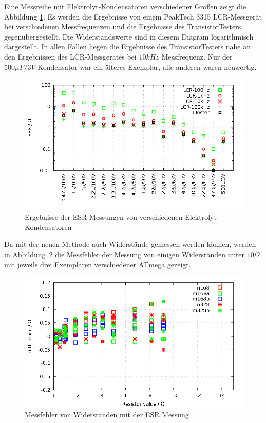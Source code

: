 Eine Messreihe mit Elektrolyt-Kondensatoren verschiedener Größen zeigt die Abbildung \ref{fig:ElcoESR}.
Es werden die Ergebnisse von einem PeakTech 3315 LCR-Messgerät bei verschiedenen Messfrequenzen und die
Ergebnisse des TransistorTesters gegenübergestellt. Die Widerstandswerte sind in diesem Diagram logarithmisch dargestellt.
In allen Fällen liegen die Ergebnisse des TransistorTesters
nahe an den Ergebnissen des LCR-Messgerätes bei \(10kHz\) Messfrequenz. 
Nur der \(500\mu F/3V\) Kondensator war ein älteres Exemplar, alle anderen waren neuwertig.

\begin{figure}[H]
\centering
 \includegraphics[width=16cm]{../GNU/Elco_esr.pdf}
\caption{Ergebnisse der ESR-Messungen von verschiedenen Elektrolyt-Kondensatoren}
\label{fig:ElcoESR}
\end{figure}

Da mit der neuen Methode auch Widerstände gemessen werden können, werden in Abbildung~\ref{fig:res_esr} die
Messfehler der Messung von einigen Widerständen unter \(10\Omega\) mit jeweils drei Exemplaren verschiedener
ATmega gezeigt.  

\begin{figure}[H]
\centering
\includegraphics[width=18cm]{../GNU/res_esr.pdf}
\caption{Messfehler von Widerständen mit der ESR Messung}
\label{fig:res_esr}
\end{figure}

